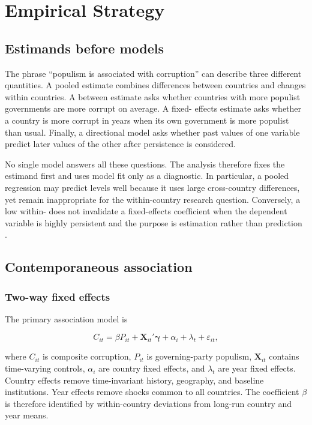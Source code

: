 \chapter{Empirical Strategy}
\label{chap:methods}

\section{Estimands before models}

The phrase ``populism is associated with corruption'' can describe three different quantities. A
pooled estimate combines differences between countries and changes within countries. A between
estimate asks whether countries with more populist governments are more corrupt on average. A fixed-
effects estimate asks whether a country is more corrupt in years when its own government is more
populist than usual. Finally, a directional model asks whether past values of one variable predict
later values of the other after persistence is considered.

No single model answers all these questions. The analysis therefore fixes the estimand first and uses
model fit only as a diagnostic. In particular, a pooled regression may predict levels well because it
uses large cross-country differences, yet remain inappropriate for the within-country research
question. Conversely, a low within-
\Rtwo{} does not invalidate a fixed-effects coefficient when the dependent variable is highly
persistent and the purpose is estimation rather than prediction \citep{wooldridge2010}.

\section{Contemporaneous association}

\subsection{Two-way fixed effects}

The primary association model is

\begin{equation}
  C_{it} = \beta P_{it} + \mathbf{X}_{it}'\boldsymbol{\gamma}
  + \alpha_i + \lambda_t + \varepsilon_{it},
  \label{eq:twfe}
\end{equation}

where $C_{it}$ is composite corruption, $P_{it}$ is governing-party populism,
$\mathbf{X}_{it}$ contains time-varying controls, $\alpha_i$ are country fixed effects, and
$\lambda_t$ are year fixed effects. Country effects remove time-invariant history, geography, and
baseline institutions. Year effects remove shocks common to all countries. The coefficient $\beta$
is therefore identified by within-country deviations from long-run country and year means.

